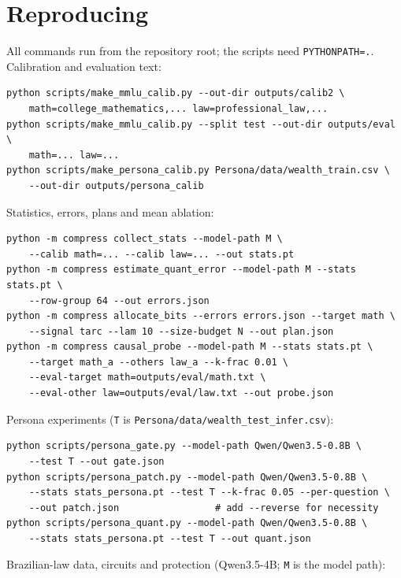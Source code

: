 \documentclass[11pt]{article}
\newcommand{\code}[1]{\texttt{#1}}
\begin{document}
\section{Reproducing}
All commands run from the repository root; the scripts need \code{PYTHONPATH=.}. Calibration and evaluation text:
\begin{small}\begin{verbatim}
python scripts/make_mmlu_calib.py --out-dir outputs/calib2 \
    math=college_mathematics,... law=professional_law,...
python scripts/make_mmlu_calib.py --split test --out-dir outputs/eval \
    math=... law=...
python scripts/make_persona_calib.py Persona/data/wealth_train.csv \
    --out-dir outputs/persona_calib
\end{verbatim}\end{small}
Statistics, errors, plans and mean ablation:
\begin{small}\begin{verbatim}
python -m compress collect_stats --model-path M \
    --calib math=... --calib law=... --out stats.pt
python -m compress estimate_quant_error --model-path M --stats stats.pt \
    --row-group 64 --out errors.json
python -m compress allocate_bits --errors errors.json --target math \
    --signal tarc --lam 10 --size-budget N --out plan.json
python -m compress causal_probe --model-path M --stats stats.pt \
    --target math_a --others law_a --k-frac 0.01 \
    --eval-target math=outputs/eval/math.txt \
    --eval-other law=outputs/eval/law.txt --out probe.json
\end{verbatim}\end{small}
Persona experiments (\code{T} is \code{Persona/data/wealth\_test\_infer.csv}):
\begin{small}\begin{verbatim}
python scripts/persona_gate.py --model-path Qwen/Qwen3.5-0.8B \
    --test T --out gate.json
python scripts/persona_patch.py --model-path Qwen/Qwen3.5-0.8B \
    --stats stats_persona.pt --test T --k-frac 0.05 --per-question \
    --out patch.json                 # add --reverse for necessity
python scripts/persona_quant.py --model-path Qwen/Qwen3.5-0.8B \
    --stats stats_persona.pt --test T --out quant.json
\end{verbatim}\end{small}
Brazilian-law data, circuits and protection (Qwen3.5-4B; \code{M} is the model path):
\end{document}
